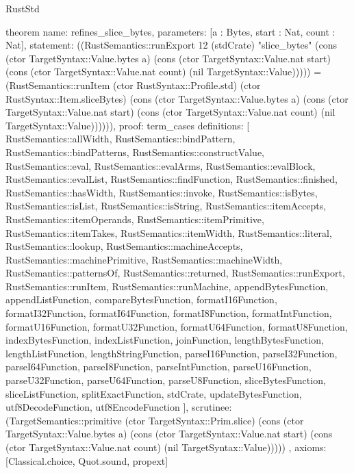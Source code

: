 \begin{lexlean}{RustStd}
\begin{semanticmodule}
theorem{
  name: refines_slice_bytes,
  parameters: [a : Bytes, start : Nat, count : Nat],
  statement: ((RustSemantics::runExport 12 (stdCrate) "slice_bytes" (cons (ctor TargetSyntax::Value.bytes a) (cons (ctor TargetSyntax::Value.nat start) (cons (ctor TargetSyntax::Value.nat count) (nil TargetSyntax::Value))))) = (RustSemantics::runItem (ctor RustSyntax::Profile.std) (ctor RustSyntax::Item.sliceBytes) (cons (ctor TargetSyntax::Value.bytes a) (cons (ctor TargetSyntax::Value.nat start) (cons (ctor TargetSyntax::Value.nat count) (nil TargetSyntax::Value)))))),
  proof: term_cases{
    definitions: [
      RustSemantics::allWidth,
      RustSemantics::bindPattern,
      RustSemantics::bindPatterns,
      RustSemantics::constructValue,
      RustSemantics::eval,
      RustSemantics::evalArms,
      RustSemantics::evalBlock,
      RustSemantics::evalList,
      RustSemantics::findFunction,
      RustSemantics::finished,
      RustSemantics::hasWidth,
      RustSemantics::invoke,
      RustSemantics::isBytes,
      RustSemantics::isList,
      RustSemantics::isString,
      RustSemantics::itemAccepts,
      RustSemantics::itemOperands,
      RustSemantics::itemPrimitive,
      RustSemantics::itemTakes,
      RustSemantics::itemWidth,
      RustSemantics::literal,
      RustSemantics::lookup,
      RustSemantics::machineAccepts,
      RustSemantics::machinePrimitive,
      RustSemantics::machineWidth,
      RustSemantics::patternsOf,
      RustSemantics::returned,
      RustSemantics::runExport,
      RustSemantics::runItem,
      RustSemantics::runMachine,
      appendBytesFunction,
      appendListFunction,
      compareBytesFunction,
      formatI16Function,
      formatI32Function,
      formatI64Function,
      formatI8Function,
      formatIntFunction,
      formatU16Function,
      formatU32Function,
      formatU64Function,
      formatU8Function,
      indexBytesFunction,
      indexListFunction,
      joinFunction,
      lengthBytesFunction,
      lengthListFunction,
      lengthStringFunction,
      parseI16Function,
      parseI32Function,
      parseI64Function,
      parseI8Function,
      parseIntFunction,
      parseU16Function,
      parseU32Function,
      parseU64Function,
      parseU8Function,
      sliceBytesFunction,
      sliceListFunction,
      splitExactFunction,
      stdCrate,
      updateBytesFunction,
      utf8DecodeFunction,
      utf8EncodeFunction
    ],
    scrutinee: (TargetSemantics::primitive (ctor TargetSyntax::Prim.slice) (cons (ctor TargetSyntax::Value.bytes a) (cons (ctor TargetSyntax::Value.nat start) (cons (ctor TargetSyntax::Value.nat count) (nil TargetSyntax::Value)))))
  },
  axioms: [Classical.choice, Quot.sound, propext]
}


\end{semanticmodule}
\end{lexlean}
